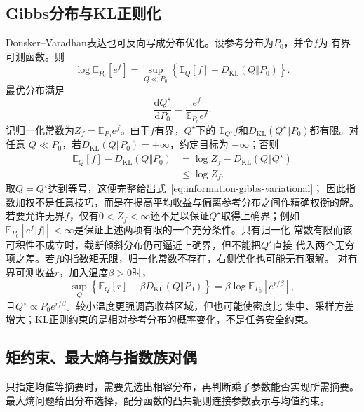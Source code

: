 \subsection{Gibbs分布与KL正则化}
Donsker--Varadhan表达也可反向写成分布优化。设参考分布为\(P_0\)，并令\(f\)为
有界可测函数。则
\begin{equation}
  \log\mathbb{E}_{P_0}[e^f]
  =\sup_{Q\ll P_0}
  \left\{
    \mathbb{E}_Q[f]-D_{\mathrm{KL}}(Q\Vert P_0)\right\}.
  \label{eq:information-gibbs-variational}
\end{equation}
最优分布满足
\[
  \frac{\mathrm{d}Q^\star}{\mathrm{d}P_0}
  =\frac{e^f}{\mathbb{E}_{P_0}e^f}.
\]
记归一化常数为\(Z_f=\mathbb{E}_{P_0}e^f\)。由于\(f\)有界，\(Q^\star\)下的
\(\mathbb{E}_{Q^\star}f\)和\(D_{\mathrm{KL}}(Q^\star\Vert P_0)\)都有限。对任意
\(Q\ll P_0\)，若\(D_{\mathrm{KL}}(Q\Vert P_0)=+\infty\)，约定目标为
\(-\infty\)；否则
\[
\begin{aligned}
  \mathbb{E}_Q[f]-D_{\mathrm{KL}}(Q\Vert P_0)
  &=
  \log Z_f-D_{\mathrm{KL}}(Q\Vert Q^\star)\\
  &\leq\log Z_f.
\end{aligned}
\]
取\(Q=Q^\star\)达到等号，这便完整给出式~\eqref{eq:information-gibbs-variational}；
因此指数加权不是任意技巧，而是在提高平均收益与偏离参考分布之间作精确权衡的解。
若要允许无界\(f\)，仅有\(0<Z_f<\infty\)还不足以保证\(Q^\star\)取得上确界；例如
\(\mathbb{E}_{P_0}[e^f|f|]<\infty\)是保证上述两项有限的一个充分条件。只有归一化
常数有限而该可积性不成立时，截断倾斜分布仍可逼近上确界，但不能把\(Q^\star\)直接
代入两个无穷项之差。若\(f\)的指数矩无限，归一化常数不存在，右侧优化也可能无有限解。
对有界可测收益\(r\)，加入温度\(\beta>0\)时，
\[
  \sup_Q\left\{
    \mathbb{E}_Q[r]-\beta D_{\mathrm{KL}}(Q\Vert P_0)\right\}
  =
  \beta\log\mathbb{E}_{P_0}[e^{r/\beta}],
\]
且\(Q^\star\propto P_0e^{r/\beta}\)。较小温度更强调高收益区域，但也可能使密度比
集中、采样方差增大；KL正则约束的是相对参考分布的概率变化，不是任务安全约束。
\subsection{矩约束、最大熵与指数族对偶}

只指定均值等摘要时，需要先选出相容分布，再判断乘子参数能否实现所需摘要。最大熵问题给出分布选择，配分函数的凸共轭则连接参数表示与均值约束。

